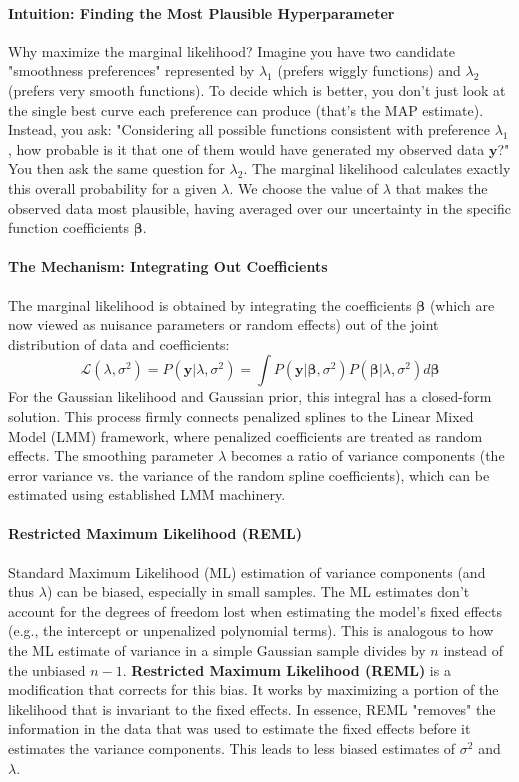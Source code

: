 \documentclass[11pt, a4paper]{article}
\begin{document}
\begin{itemize}
\paragraph{Intuition: Finding the Most Plausible Hyperparameter}
Why maximize the marginal likelihood? Imagine you have two candidate "smoothness preferences" represented by $\lambda_1$ (prefers wiggly functions) and $\lambda_2$ (prefers very smooth functions). To decide which is better, you don't just look at the single best curve each preference can produce (that's the MAP estimate). Instead, you ask: "Considering all possible functions consistent with preference $\lambda_1$, how probable is it that one of them would have generated my observed data $\mathbf{y}$?" You then ask the same question for $\lambda_2$. The marginal likelihood calculates exactly this overall probability for a given $\lambda$. We choose the value of $\lambda$ that makes the observed data most plausible, having averaged over our uncertainty in the specific function coefficients $\boldsymbol{\beta}$.

\paragraph{The Mechanism: Integrating Out Coefficients}
The marginal likelihood is obtained by integrating the coefficients $\boldsymbol{\beta}$ (which are now viewed as nuisance parameters or random effects) out of the joint distribution of data and coefficients:
\[ \mathcal{L}(\lambda, \sigma^2) = P(\mathbf{y}|\lambda, \sigma^2) = \int P(\mathbf{y}|\boldsymbol{\beta}, \sigma^2) P(\boldsymbol{\beta}|\lambda, \sigma^2) d\boldsymbol{\beta} \]
For the Gaussian likelihood and Gaussian prior, this integral has a closed-form solution. This process firmly connects penalized splines to the Linear Mixed Model (LMM) framework, where penalized coefficients are treated as random effects. The smoothing parameter $\lambda$ becomes a ratio of variance components (the error variance vs. the variance of the random spline coefficients), which can be estimated using established LMM machinery.

\paragraph{Restricted Maximum Likelihood (REML)}
Standard Maximum Likelihood (ML) estimation of variance components (and thus $\lambda$) can be biased, especially in small samples. The ML estimates don't account for the degrees of freedom lost when estimating the model's fixed effects (e.g., the intercept or unpenalized polynomial terms). This is analogous to how the ML estimate of variance in a simple Gaussian sample divides by $n$ instead of the unbiased $n-1$.
\textbf{Restricted Maximum Likelihood (REML)} is a modification that corrects for this bias. It works by maximizing a portion of the likelihood that is invariant to the fixed effects. In essence, REML "removes" the information in the data that was used to estimate the fixed effects before it estimates the variance components. This leads to less biased estimates of $\sigma^2$ and $\lambda$.


\end{itemize}
\end{document}
